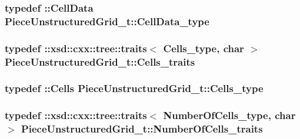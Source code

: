 \subsubsection[{\texorpdfstring{Cell\+Data\+\_\+type}{CellData_type}}]{\setlength{\rightskip}{0pt plus 5cm}typedef \+::{\bf Cell\+Data} {\bf Piece\+Unstructured\+Grid\+\_\+t\+::\+Cell\+Data\+\_\+type}}\hypertarget{classPieceUnstructuredGrid__t_a4232a7b88477ee6f692a4e5fab6a65d1}{}\label{classPieceUnstructuredGrid__t_a4232a7b88477ee6f692a4e5fab6a65d1}
\subsubsection[{\texorpdfstring{Cells\+\_\+traits}{Cells_traits}}]{\setlength{\rightskip}{0pt plus 5cm}typedef \+::xsd\+::cxx\+::tree\+::traits$<$ {\bf Cells\+\_\+type}, char $>$ {\bf Piece\+Unstructured\+Grid\+\_\+t\+::\+Cells\+\_\+traits}}\hypertarget{classPieceUnstructuredGrid__t_a33252b6f55b5ae830ceecdf9be42cce1}{}\label{classPieceUnstructuredGrid__t_a33252b6f55b5ae830ceecdf9be42cce1}
\subsubsection[{\texorpdfstring{Cells\+\_\+type}{Cells_type}}]{\setlength{\rightskip}{0pt plus 5cm}typedef \+::{\bf Cells} {\bf Piece\+Unstructured\+Grid\+\_\+t\+::\+Cells\+\_\+type}}\hypertarget{classPieceUnstructuredGrid__t_aca1ec38eff08bde0cd115c54dbb7a20f}{}\label{classPieceUnstructuredGrid__t_aca1ec38eff08bde0cd115c54dbb7a20f}
\subsubsection[{\texorpdfstring{Number\+Of\+Cells\+\_\+traits}{NumberOfCells_traits}}]{\setlength{\rightskip}{0pt plus 5cm}typedef \+::xsd\+::cxx\+::tree\+::traits$<$ {\bf Number\+Of\+Cells\+\_\+type}, char $>$ {\bf Piece\+Unstructured\+Grid\+\_\+t\+::\+Number\+Of\+Cells\+\_\+traits}}\hypertarget{classPieceUnstructuredGrid__t_a7c7607d306bde9e187b9cb3f570d6155}{}\label{classPieceUnstructuredGrid__t_a7c7607d306bde9e187b9cb3f570d6155}
